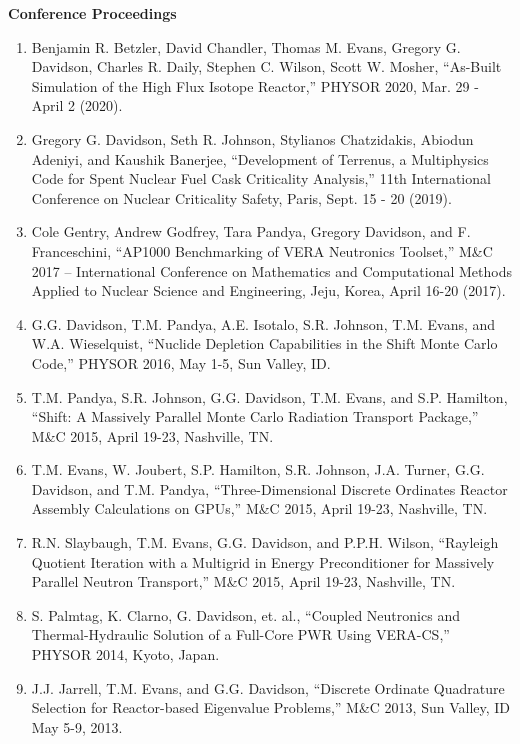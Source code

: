 \documentclass[letterpaper,11pt]{article}
\newcommand{\leftsubheading}[1]{
  \textbf{#1\vspace{-6pt} \\}}
\begin{document}

\leftsubheading{Conference Proceedings}
\begin{enumerate}
  \item Benjamin R. Betzler, David Chandler, Thomas M. Evans, Gregory
    G. Davidson, Charles R. Daily, Stephen C. Wilson, Scott W. Mosher,
    ``As-Built Simulation of the High Flux Isotope Reactor,'' PHYSOR
    2020, Mar. 29 - April 2 (2020).
  \item Gregory G. Davidson, Seth R. Johnson, Stylianos Chatzidakis,
    Abiodun Adeniyi, and Kaushik Banerjee, ``Development of Terrenus,
    a Multiphysics Code for Spent Nuclear Fuel Cask Criticality
    Analysis,'' 11th International Conference on Nuclear Criticality
    Safety, Paris, Sept. 15 - 20 (2019).
  \item Cole Gentry, Andrew Godfrey, Tara Pandya, Gregory Davidson, and
    F. Franceschini, ``AP1000 Benchmarking of VERA Neutronics
    Toolset,'' M\&C 2017 – International Conference on Mathematics and
    Computational Methods Applied to Nuclear Science and Engineering,
    Jeju, Korea, April 16-20 (2017).
  \item G.G. Davidson, T.M. Pandya, A.E. Isotalo, S.R. Johnson,
    T.M. Evans, and W.A. Wieselquist, ``Nuclide Depletion Capabilities
    in the Shift Monte Carlo Code,'' PHYSOR 2016, May 1-5, Sun Valley,
    ID.
  \item T.M. Pandya, S.R. Johnson, G.G. Davidson, T.M. Evans, and
    S.P. Hamilton, ``Shift: A Massively Parallel Monte Carlo Radiation
    Transport Package,'' M\&C 2015, April 19-23, Nashville, TN.
  \item T.M. Evans, W. Joubert, S.P. Hamilton, S.R. Johnson,
    J.A. Turner, G.G. Davidson, and T.M. Pandya, ``Three-Dimensional
    Discrete Ordinates Reactor Assembly Calculations on GPUs,'' M\&C
    2015, April 19-23, Nashville, TN.
  \item R.N. Slaybaugh, T.M. Evans, G.G. Davidson, and P.P.H. Wilson,
    ``Rayleigh Quotient Iteration with a Multigrid in Energy
    Preconditioner for Massively Parallel Neutron Transport,'' M\&C
    2015, April 19-23, Nashville, TN.
  \item S. Palmtag, K. Clarno, G. Davidson, et. al., ``Coupled
    Neutronics and Thermal-Hydraulic Solution of a Full-Core PWR Using
    VERA-CS,'' PHYSOR 2014, Kyoto, Japan.
  \item J.J. Jarrell, T.M. Evans, and G.G. Davidson, ``Discrete
    Ordinate Quadrature Selection for Reactor-based Eigenvalue
    Problems,'' M\&C 2013, Sun Valley, ID May 5-9, 2013.

\end{enumerate}
\end{document}
